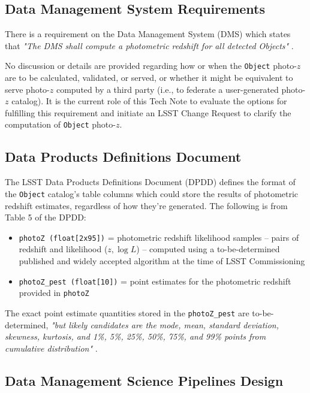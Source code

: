 \documentclass[DM,lsstdraft,toc]{lsstdoc}
\begin{document}
\subsection{Data Management System Requirements}\label{ssec:docs_dmsr}

There is a requirement on the Data Management System (DMS) which states that {\it "The DMS shall compute a photometric redshift for all detected Objects"} . 

No discussion or details are provided regarding how or when the {\tt Object} photo-$z$ are to be calculated, validated, or served, or whether it might be equivalent to serve photo-$z$ computed by a third party (i.e., to federate a user-generated photo-$z$ catalog).
It is the current role of this Tech Note to evaluate the options for fulfilling this requirement and initiate an LSST Change Request to clarify the computation of {\tt Object} photo-$z$.

\subsection{Data Products Definitions Document}\label{ssec:docs_dpdd}

The LSST Data Products Definitions Document (DPDD)  defines the format of the {\tt Object} catalog's table columns which could store the results of photometric redshift estimates, regardless of how they're generated. 
The following is from Table 5 of the DPDD:
\begin{itemize}[noitemsep,topsep=-10pt]
\item \texttt{photoZ (float[2x95])} = photometric redshift likelihood samples -- pairs of redshift and likelihood ($z,\log{L}$) -- computed using a to-be-determined published and widely accepted algorithm at the time of LSST Commissioning
\item \texttt{photoZ\_pest (float[10])} = point estimates for the photometric redshift provided in {\tt photoZ}
\end{itemize}

The exact point estimate quantities stored in the \texttt{photoZ\_pest} are to-be-determined, {\it "but likely candidates are the mode, mean, standard deviation, skewness, kurtosis, and 1\%, 5\%, 25\%, 50\%, 75\%, and 99\% points from cumulative distribution"} . 

\subsection{Data Management Science Pipelines Design}\label{ssec:docs_ldm151}
\end{document}
